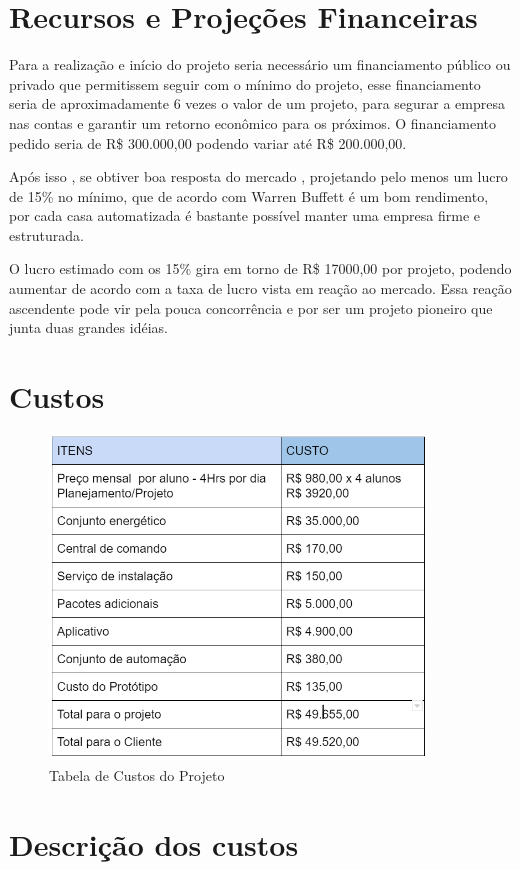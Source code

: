 \section{Recursos e Projeções Financeiras}

\par Para a realização e início do projeto seria necessário um financiamento público ou privado que permitissem seguir com o mínimo do projeto, esse financiamento seria de aproximadamente 6 vezes o valor de um projeto, para segurar a empresa nas contas e garantir um retorno econômico para os próximos. O financiamento pedido seria de R\$ 300.000,00 podendo variar até R\$ 200.000,00.
\par Após isso , se obtiver boa resposta do mercado , projetando pelo menos um lucro de 15\% no mínimo, que de acordo com Warren Buffett é um bom rendimento, por cada casa automatizada é bastante possível manter uma empresa firme e estruturada.
\par O lucro estimado com os 15\% gira em torno de R\$ 17000,00 por projeto, podendo aumentar de acordo com a taxa de lucro vista em reação ao mercado. Essa reação ascendente pode vir pela pouca concorrência e por ser um projeto pioneiro que junta duas grandes idéias.

\section{Custos}

\begin{figure}[!h]
\caption{Tabela de Custos do Projeto}
\centering
\includegraphics[width=10cm]{figuras/tabela_custos}
\end{figure}

\section{Descrição dos custos}

